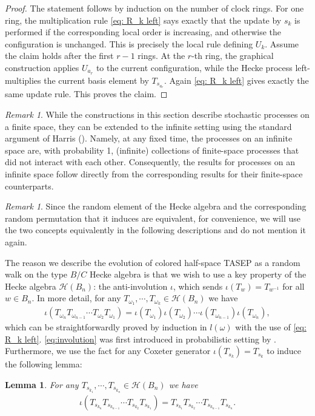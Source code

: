 \documentclass[12pt,a4paper]{amsart}
\newtheorem{lemma}[theorem]{Lemma}
\theoremstyle{remark}
\newtheorem{remark}[theorem]{Remark}
\numberwithin{equation}{section} \numberwithin{theorem}{section}
\begin{document}
\begin{proof}
The statement follows by induction on the number of clock rings. 
For one ring, the multiplication rule \eqref{eq: R_k left} says exactly that the update by $s_k$ is performed if the corresponding local order is increasing, and otherwise the configuration is unchanged. 
This is precisely the local rule defining $U_k$. 
Assume the claim holds after the first $r-1$ rings. 
At the $r$-th ring, the graphical construction applies $U_{a_r}$ to the current configuration, while the Hecke process left-multiplies the current basis element by $T_{s_{a_r}}$. 
Again \eqref{eq: R_k left} gives exactly the same update rule. 
This proves the claim.
\end{proof}


\begin{remark}
While the constructions in this section describe stochastic processes on a finite space, they can be extended to the infinite setting using the standard argument of Harris (\cite{Har78}). Namely, at any fixed time, the processes on an infinite space are, with probability 1, (infinite) collections of finite-space processes that did not interact with each other. Consequently, the results for processes on an infinite space follow directly from the corresponding results for their finite-space counterparts.
\end{remark}

\begin{remark}
Since the random element of the Hecke algebra and the corresponding random permutation that it induces are equivalent, for convenience, we will use the two concepts equivalently in the following descriptions and do not mention it again.
\end{remark}

The reason we describe the evolution of colored half-space TASEP as a random walk on the type $B/C$ Hecke algebra is that we wish to use a key property of the Hecke algebra $\mathcal{H}(B_n)$: the anti-involution $\iota$, which sends $\iota(T_w)=T_{w^{-1}}$ for all $w\in B_n$. In more detail, for any $T_{\omega_1},\cdots,T_{\omega_k}\in\mathcal{H}(B_n)$ we have 
\begin{align}
\label{eq:involution}
\iota(T_{\omega_n}T_{\omega_{n-1}} \cdots T_{\omega_2}T_{\omega_1})=\iota(T_{\omega_1})\iota(T_{\omega_2})\cdots \iota(T_{\omega_{n-1}})\iota(T_{\omega_n}),
\end{align}
which can be straightforwardly proved by induction in $l(\omega)$ with the use of  \eqref{eq: R_k left}. \eqref{eq:involution} was first introduced in probabilistic setting by \cite{Buf20}. Furthermore, we use the fact for any Coxeter generator $\iota(T_{s_{k}})=T_{s_{k}}$ to induce the following lemma:
\begin{lemma}
\label{lem:inverse}
For any $T_{s_{k_1}},\cdots,T_{s_{k_n}}\in\mathcal{H}(B_n)$ we have 
\begin{align}
\label{eq:involution-generator}
\iota(T_{s_{k_n}}T_{s_{k_{n-1}}} \cdots T_{s_{k_2}}T_{s_{k_1}})=T_{s_{k_1}}T_{s_{k_2}}\cdots T_{s_{k_{n-1}}}T_{s_{k_n}}.
\end{align}
\end{lemma}
\end{document}
